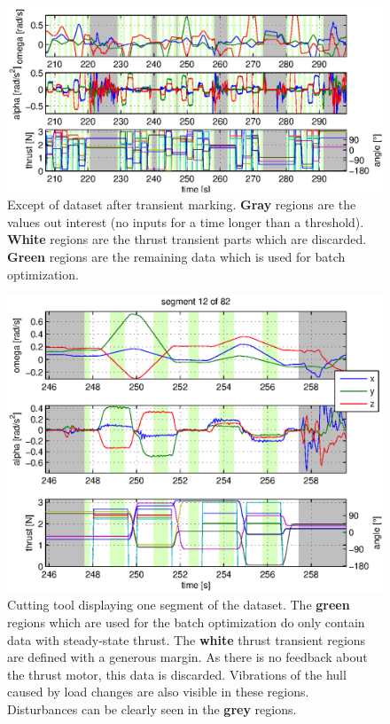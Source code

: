 \begin{figure}[htbp]
\captionsetup{width=0.9\textwidth}
\centering
\includegraphics[scale=0.8]{images/interactive_cut/interactive_cut_long_modified.eps}
\caption{Except of dataset after transient marking. \textbf{Gray} regions are the values out interest (no inputs for a time longer than a threshold). \textbf{White} regions are the thrust transient parts which are discarded. \textbf{Green} regions are the remaining data which is used for batch optimization.}
\label{fig:data_selection_long}
\end{figure}

\begin{figure}[htbp]
\captionsetup{width=0.9\textwidth}
\centering
\includegraphics[scale=0.8]{images/interactive_cut/interactive_cut_detail_modified.eps}
\caption{Cutting tool displaying one segment of the dataset. 
The \textbf{green} regions which are used for the batch optimization do only contain data with steady-state thrust. 
The \textbf{white} thrust transient regions are defined with a generous margin.
As there is no feedback about the thrust motor, this data is discarded.
Vibrations of the hull caused by load changes are also visible in these regions.
Disturbances can be clearly seen in the \textbf{grey} regions.
}
\label{fig:data_selection_short}
\end{figure}


